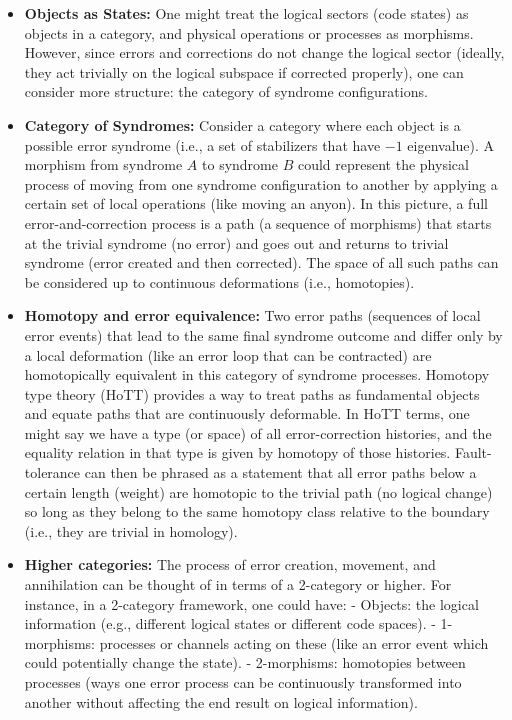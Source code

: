 \documentclass[11pt]{article}
\begin{document}
\begin{itemize}
    \item \textbf{Objects as States:} One might treat the logical sectors (code states) as objects in a category, and physical operations or processes as morphisms. However, since errors and corrections do not change the logical sector (ideally, they act trivially on the logical subspace if corrected properly), one can consider more structure: the category of syndrome configurations.
    \item \textbf{Category of Syndromes:} Consider a category where each object is a possible error syndrome (i.e., a set of stabilizers that have $-1$ eigenvalue). A morphism from syndrome $A$ to syndrome $B$ could represent the physical process of moving from one syndrome configuration to another by applying a certain set of local operations (like moving an anyon). In this picture, a full error-and-correction process is a path (a sequence of morphisms) that starts at the trivial syndrome (no error) and goes out and returns to trivial syndrome (error created and then corrected). The space of all such paths can be considered up to continuous deformations (i.e., homotopies).
    \item \textbf{Homotopy and error equivalence:} Two error paths (sequences of local error events) that lead to the same final syndrome outcome and differ only by a local deformation (like an error loop that can be contracted) are homotopically equivalent in this category of syndrome processes. Homotopy type theory (HoTT) provides a way to treat paths as fundamental objects and equate paths that are continuously deformable. In HoTT terms, one might say we have a type (or space) of all error-correction histories, and the equality relation in that type is given by homotopy of those histories. Fault-tolerance can then be phrased as a statement that all error paths below a certain length (weight) are homotopic to the trivial path (no logical change) so long as they belong to the same homotopy class relative to the boundary (i.e., they are trivial in homology).
    \item \textbf{Higher categories:} The process of error creation, movement, and annihilation can be thought of in terms of a 2-category or higher. For instance, in a 2-category framework, one could have:
        - Objects: the logical information (e.g., different logical states or different code spaces).
        - 1-morphisms: processes or channels acting on these (like an error event which could potentially change the state).
        - 2-morphisms: homotopies between processes (ways one error process can be continuously transformed into another without affecting the end result on logical information).
        

\end{itemize}
\end{document}
